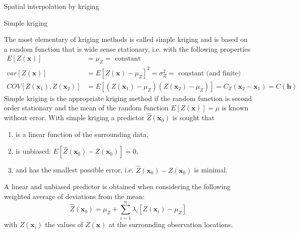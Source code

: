 \documentclass[8pt]{beamer}
\renewcommand{\emph}[1]{\textcolor{myorange}{#1}}
\begin{document}
\begin{frame}{Spatial interpolation by kriging}
    \begin{block}{Simple kriging}
    \end{block}
    The most elementary of \emph{kriging methods} is called \alert{simple kriging} and  is based on a \emph{random function} that is \emph{wide sense stationary}, i.e. with the following properties
    \begin{align*}
        E[Z(\mathbf{x})] &= \mu_Z = \text{ constant}\\
        var[Z(\mathbf{x})] &= E[Z(\mathbf{x})-\mu_Z ]^2 = \sigma_Z^2 = \text{ constant (and finite)}\\
        COV\left[Z(\mathbf{x}_1), Z(\mathbf{x}_2)\right] &= E\left[ (Z(\mathbf{x}_1)-\mu_Z )  (Z(\mathbf{x}_2)-\mu_Z )\right] = C_Z (\mathbf{x}_2 - \mathbf{x}_1 ) = C(\mathbf{h})
    \end{align*}
    \emph{Simple kriging} is the appropriate \emph{kriging method} if the \emph{random function} is \emph{second order stationary} and the \emph{mean} of the \emph{random function} $E[Z(\mathbf{x})] = \mu$ is known without error. With \emph{simple kriging} a predictor $\hat{Z}(\mathbf{x}_0)$ is sought that
    \begin{enumerate}
        \item is a linear function of the surrounding data,
        \item is unbiased: $E[\hat{Z}(\mathbf{x}_0)- Z(\mathbf{x}_0) ] = 0$,
        \item and has the smallest possible error, i.e. $\hat{Z}(\mathbf{x}_0) - Z(\mathbf{x}_0)$ is minimal.
    \end{enumerate}
    A \emph{linear} and \emph{unbiased} predictor is obtained when considering the following \emph{weighted average} of deviations from the \emph{mean}:
            \begin{equation}
                \hat{Z}(\mathbf{x}_0) = \mu_Z + \sum_{i=1}^n \lambda_i [Z(\mathbf{x}_i)-\mu_Z]
                \label{e75}
            \end{equation}
            with $Z(\mathbf{x}_i)$ the values of $Z(\mathbf{x})$ at the surrounding observation locations.

\end{frame}
\end{document}
